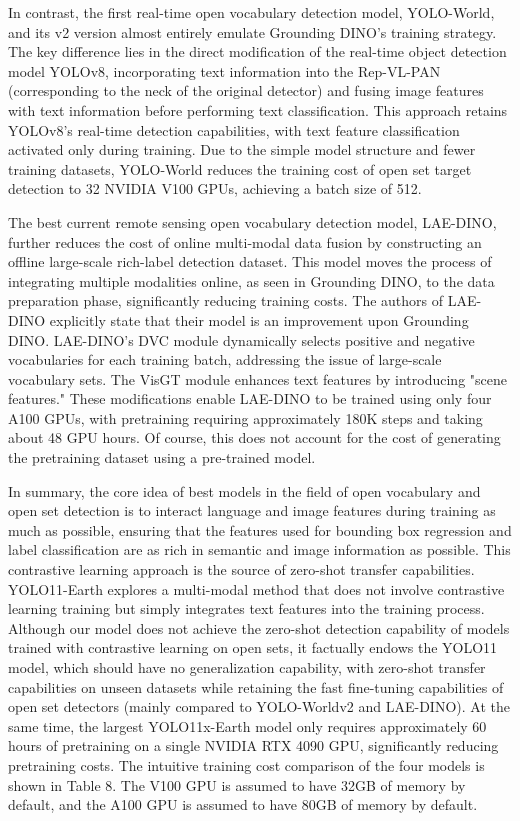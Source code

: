 \documentclass{article}
\begin{document}
In contrast, the first real-time open vocabulary detection model, YOLO-World, and its v2 version almost 
entirely emulate Grounding DINO's training strategy. The key difference lies in the direct modification of 
the real-time object detection model YOLOv8, incorporating text information into the Rep-VL-PAN (corresponding 
to the neck of the original detector) and fusing image features with text information before performing text 
classification. This approach retains YOLOv8's real-time detection capabilities, with text feature classification 
activated only during training. Due to the simple model structure and fewer training datasets, YOLO-World reduces 
the training cost of open set target detection to 32 NVIDIA V100 GPUs, achieving a batch size of 512.

The best current remote sensing open vocabulary detection model, LAE-DINO, further reduces the cost of 
online multi-modal data fusion by constructing an offline large-scale rich-label detection dataset. This model 
moves the process of integrating multiple modalities online, as seen in Grounding DINO, to the data preparation 
phase, significantly reducing training costs. The authors of LAE-DINO explicitly state that their model is an 
improvement upon Grounding DINO. LAE-DINO's DVC module dynamically selects positive and negative vocabularies 
for each training batch, addressing the issue of large-scale vocabulary sets. The VisGT module enhances text 
features by introducing "scene features." These modifications enable LAE-DINO to be trained using only four 
A100 GPUs, with pretraining requiring approximately 180K steps and taking about 48 GPU hours. Of course, 
this does not account for the cost of generating the pretraining dataset using a pre-trained model.

In summary, the core idea of best models in the field of open vocabulary and open set detection 
is to interact language and image features during training as much as possible, ensuring that the features 
used for bounding box regression and label classification are as rich in semantic and image information as 
possible. This contrastive learning approach is the source of zero-shot transfer capabilities.
YOLO11-Earth explores a multi-modal method that does not involve contrastive learning training but simply 
integrates text features into the training process. Although our model does not achieve the zero-shot 
detection capability of models trained with contrastive learning on open sets, it factually endows 
the YOLO11 model, which should have no generalization capability, with zero-shot transfer capabilities 
on unseen datasets while retaining the fast fine-tuning capabilities of open set detectors (mainly compared 
to YOLO-Worldv2 and LAE-DINO). At the same time, the largest YOLO11x-Earth model only requires approximately 
60 hours of pretraining on a single NVIDIA RTX 4090 GPU, significantly reducing pretraining costs. The intuitive 
training cost comparison of the four models is shown in Table 8. The V100 GPU is assumed to have 32GB of 
memory by default, and the A100 GPU is assumed to have 80GB of memory by default.
\end{document}
